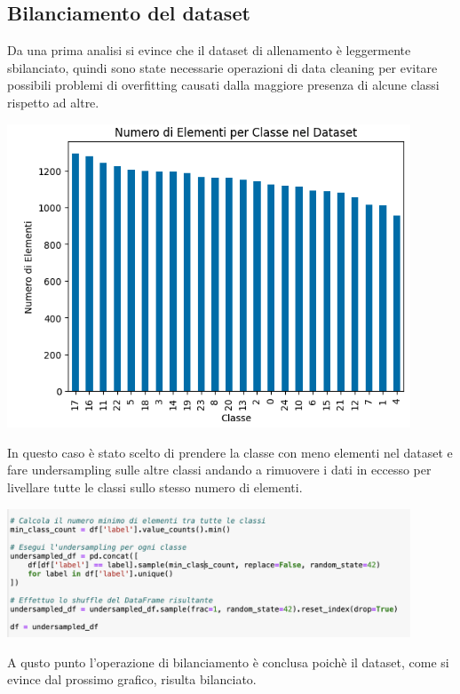 \documentclass{article}
\begin{document}
\subsection{Bilanciamento del dataset}
Da una prima analisi si evince che il dataset di allenamento è leggermente sbilanciato, quindi sono state necessarie operazioni di data cleaning per evitare possibili problemi di overfitting causati dalla maggiore presenza di alcune classi rispetto ad altre.
\begin{center}
    \includegraphics[width=0.9\textwidth]{dataset.png}
\end{center}
In questo caso è stato scelto di prendere la classe con meno elementi nel dataset e fare undersampling sulle altre classi andando a rimuovere i dati in eccesso per livellare tutte le classi sullo stesso numero di elementi.
\begin{center}
    \includegraphics[width=0.9\textwidth]{codice_undersampling.png}
\end{center}
A qusto punto l'operazione di bilanciamento è conclusa poichè il dataset, come si evince dal prossimo grafico, risulta bilanciato.
\end{document}
